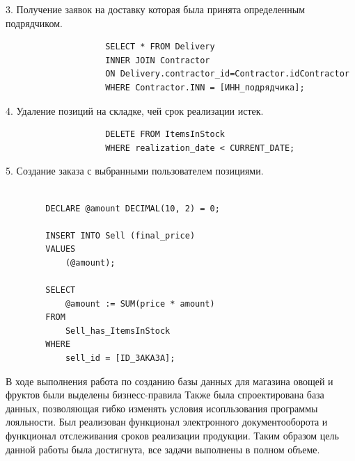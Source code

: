 \documentclass[14pt]{extreport}
\begin{document}
        3. Получение заявок на доставку которая была принята определенным подрядчиком.
            
                \begin{verbatim}
                    SELECT * FROM Delivery
                    INNER JOIN Contractor
                    ON Delivery.contractor_id=Contractor.idContractor
                    WHERE Contractor.INN = [ИНН_подрядчика];
                \end{verbatim}
            
        
        4. Удаление позиций на складке, чей срок реализации истек.
            \begin{center}
                \begin{verbatim}
                    DELETE FROM ItemsInStock
                    WHERE realization_date < CURRENT_DATE;
                \end{verbatim}
            \end{center}
        
        
        5. Создание заказа с выбранными пользователем позициями.

        \begin{verbatim}

        DECLARE @amount DECIMAL(10, 2) = 0;

        INSERT INTO Sell (final_price) 
        VALUES 
            (@amount);

        SELECT 
            @amount := SUM(price * amount) 
        FROM 
            Sell_has_ItemsInStock 
        WHERE 
            sell_id = [ID_ЗАКАЗА];

        \end{verbatim}


\conclusions{}

В ходе выполнения работа по созданию базы данных для магазина овощей и фруктов были выделены бизнесс-правила%
Также была спроектирована база данных, позволяющая гибко изменять условия исопльзования программы%
 лояльности. Был реализован функционал электронного документооборота и функционал отслеживания сроков реализации продукции.
 Таким образом цель данной работы была достигнута, все задачи выполнены в полном объеме. 
\end{document}
